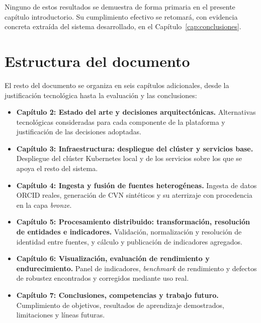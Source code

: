 Ninguno de estos resultados se demuestra de forma primaria en el presente
capítulo introductorio. Su cumplimiento efectivo se retomará, con
evidencia concreta extraída del sistema desarrollado, en el
Capítulo~\ref{cap:conclusiones}.

\section{Estructura del documento}
\label{sec:introduccion_estructura}

El resto del documento se organiza en seis capítulos adicionales, desde la
justificación tecnológica hasta la evaluación y las conclusiones:

\begin{itemize}
  \item \textbf{Capítulo 2: Estado del arte y decisiones arquitectónicas.}
  Alternativas tecnológicas consideradas para cada componente de la
  plataforma y justificación de las decisiones adoptadas.

  \item \textbf{Capítulo 3: Infraestructura: despliegue del clúster y
  servicios base.} Despliegue del clúster Kubernetes local y de los
  servicios sobre los que se apoya el resto del sistema.

  \item \textbf{Capítulo 4: Ingesta y fusión de fuentes heterogéneas.}
  Ingesta de datos ORCID reales, generación de CVN sintéticos y su
  aterrizaje con procedencia en la capa \textit{bronze}.

  \item \textbf{Capítulo 5: Procesamiento distribuido: transformación,
  resolución de entidades e indicadores.} Validación, normalización y
  resolución de identidad entre fuentes, y cálculo y publicación de
  indicadores agregados.

  \item \textbf{Capítulo 6: Visualización, evaluación de rendimiento y
  endurecimiento.} Panel de indicadores, \textit{benchmark} de rendimiento
  y defectos de robustez encontrados y corregidos mediante uso real.

  \item \textbf{Capítulo 7: Conclusiones, competencias y trabajo futuro.}
  Cumplimiento de objetivos, resultados de aprendizaje demostrados,
  limitaciones y líneas futuras.
\end{itemize}
